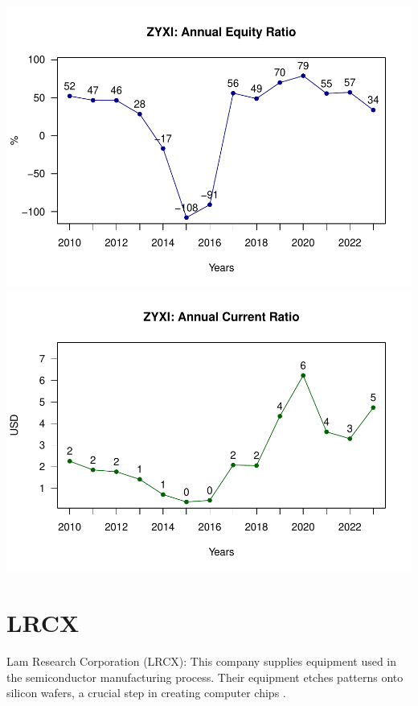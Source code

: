 \documentclass[
]{book}
\begin{document}
\includegraphics{_main_files/figure-latex/unnamed-chunk-1-14.pdf}
\includegraphics{_main_files/figure-latex/unnamed-chunk-1-15.pdf}

\hypertarget{lrcx}{%
\section{LRCX}\label{lrcx}}

Lam Research Corporation (LRCX): This company supplies equipment used in the semiconductor manufacturing process. Their equipment etches patterns onto silicon wafers, a crucial step in creating computer chips .
\end{document}
